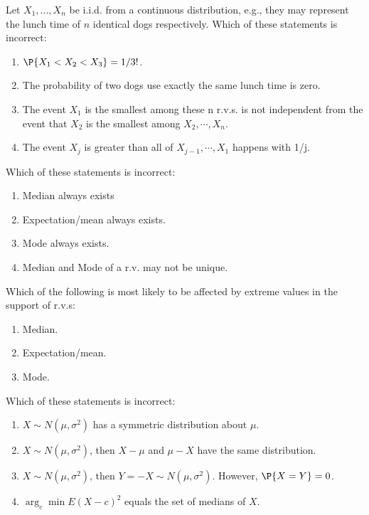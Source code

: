 \documentclass[poll_tutorial_format]{subfiles}
\begin{document}
	
	\begin{exercise}
		Let $X_1, . . . ,X_n$ be i.i.d. from a continuous distribution, e.g., they may represent the lunch time of $n$ identical dogs respectively.
		Which of these statements is incorrect:
		\begin{enumerate}
			\item $\P{X_1<X_2<X_3}=1/3!$.
			\item The probability of two dogs use exactly the same lunch time is zero.		
			\item The event $X_1$ is the smallest among these n r.v.s. is not independent from the event that $X_2$ is the smallest among $X_2,\cdots, X_n$.
			\item The event $X_j$ is greater than all of
			$X_{j-1},\cdots,X_1$ happens with 1/j.
		\end{enumerate}
	\end{exercise}
	
	
	\begin{exercise}
		Which of these statements is incorrect:
		\begin{enumerate}
			\item Median always exists 
			\item Expectation/mean always exists.
			\item Mode always exists.
			\item Median and Mode of a r.v. may not be unique. 
		\end{enumerate}
	\end{exercise}
	
	
	
	\begin{exercise}
		Which of the following is most likely to be affected by extreme values in the support of r.v.s:
		\begin{enumerate}
			\item Median.
			\item Expectation/mean.
			\item Mode. 
		\end{enumerate}
	\end{exercise}
	
	
	
	\begin{exercise}
		Which of these statements is incorrect: 
		\begin{enumerate}
			\item $X\sim N(\mu,\sigma^2)$ has a symmetric
			distribution about $\mu$.
			\item $X\sim N(\mu,\sigma^2)$, then $X-\mu$ and $\mu-X$ have the same distribution.
			\item $X\sim N(\mu,\sigma^2)$, then $Y=-X\sim N(\mu,\sigma^2)$. However, $\P{X=Y}=0$.   
			\item $\arg_c \min E(X-c)^2$ equals the set of medians of $X$.   
		\end{enumerate}
	\end{exercise}
	
\end{document}
